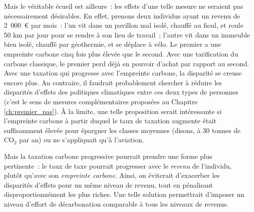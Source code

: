 \documentclass[a5paper,french,openany]{memoir}
\begin{document}
Mais le véritable écueil est ailleurs~: les effets d'une telle mesure ne seraient pas nécessairement désirables. En effet, prenons deux individus ayant un revenu de 2~000~\euro{} par mois~: l'un vit dans un pavillon mal isolé, chauffé au fioul, et roule 50 km par jour pour se rendre à son lieu de travail~; l'autre vit dans un immeuble bien isolé, chauffé par géothermie, et se déplace à vélo. Le premier a une empreinte carbone cinq fois plus élevée que le second. Avec une tarification du carbone classique, le premier perd déjà en pouvoir d'achat par rapport au second. Avec une taxation qui progresse avec l'empreinte carbone, la disparité se creuse encore plus. Au contraire, il faudrait probablement chercher à réduire les disparités d'effets des politiques climatiques entre ces deux types de personnes (c'est le sens de mesures complémentaires proposées au Chapitre \ref{ch:premier_pas}). À la limite, une telle proposition serait intéressante si l'empreinte carbone à partir duquel le taux de taxation augmente était suffisamment élevée pour épargner les classes moyennes (disons, à 30 tonnes de CO$_\text{2}$ par an) ou ne s'appliquait qu'à l'aviation. %

Mais la taxation carbone progressive pourrait prendre une forme plus pertinente~: le taux de taxe pourrait progresser avec le \textit{revenu} de l'individu, plutôt qu'avec son \textit{empreinte carbone}. Ainsi, on éviterait d'exacerber les disparités d'effets pour un même niveau de revenu, tout en pénalisant disproportionnément les plus riches. Une telle solution permettrait d'imposer un niveau d'effort de décarbonation comparable à tous les niveaux de revenus. 
\end{document}
